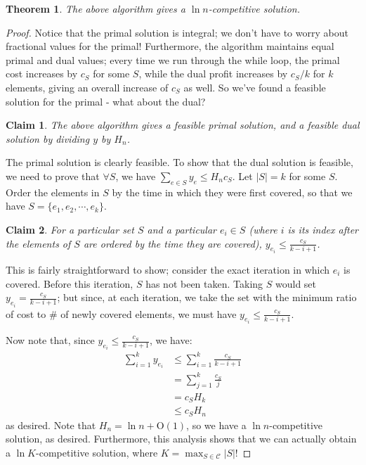 \documentclass[11pt]{article}
\newtheorem{theorem}{Theorem}[section]
\newtheorem{claim}{Claim}[theorem]
\newcommand{\C}{\mathcal{C}}
\newcommand{\bigO}{\text{O}}
\begin{document}
\begin{shaded}\begin{theorem}
The above algorithm gives a $\ln n$-competitive solution.
\end{theorem}\end{shaded}

\begin{proof}

Notice that the primal solution is integral; we don't have to worry about fractional values for the primal!  Furthermore, the algorithm maintains equal primal and dual values; every time we run through the while loop, the primal cost increases by $c_S$ for some $S$, while the dual profit increases by $c_S / k$ for $k$ elements, giving an overall increase of $c_S$ as well.  So we've found a feasible solution for the primal - what about the dual?

\begin{framed}\begin{claim}
The above algorithm gives a feasible primal solution, and a feasible dual solution by dividing $y$ by $H_n$.
\end{claim}\end{framed}

The primal solution is clearly feasible.  To show that the dual solution is feasible, we need to prove that $\forall S$, we have $\sum_{e \in S} y_e \le H_n c_S$.  Let $|S| = k$ for some $S$.  Order the elements in $S$ by the time in which they were first covered, so that we have $S = \{e_1, e_2, \cdots, e_k\}$.

\begin{framed}\begin{claim}
For a particular set $S$ and a particular $e_i \in S$ (where $i$ is its index after the elements of $S$ are ordered by the time they are covered), $y_{e_i} \le \frac{c_S}{k - i + 1}$.
\end{claim}\end{framed}

This is fairly straightforward to show; consider the exact iteration in which $e_i$ is covered.  Before this iteration, $S$ has not been taken.  Taking $S$ would set $y_{e_i} = \frac{c_S}{k-i+1}$; but since, at each iteration, we take the set with the minimum ratio of cost to \# of newly covered elements, we must have $y_{e_i} \le \frac{c_S}{k - i + 1}$.

Now note that, since $y_{e_i} \le \frac{c_S}{k - i + 1}$, we have:
\begin{align*}
\sum_{i = 1}^k y_{e_i} &\le \sum_{i=1}^k \frac{c_S}{k - i + 1} \\
&= \sum_{j = 1}^k \frac{c_S}{j} \\
&= c_S H_k \\
&\le c_S H_n
\end{align*}
as desired.  Note that $H_n = \ln n + \bigO(1)$, so we have a $\ln n$-competitive solution, as desired.  Furthermore, this analysis shows that we can actually obtain a $\ln K$-competitive solution, where $K = \max_{S \in \C} |S|$!

\end{proof}
\end{document}
